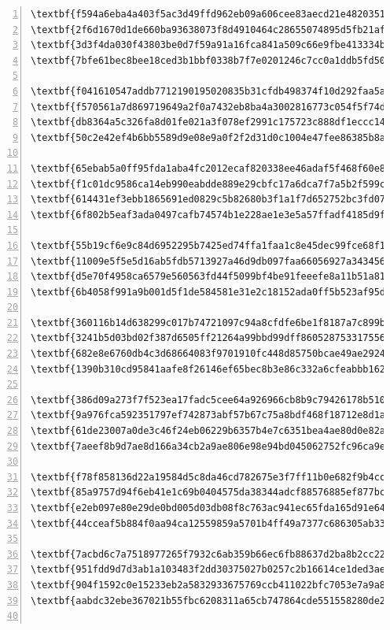 \documentclass[10pt,a4paper]{article}
\begin{document}
\begin{Verbatim}[commandchars=\\\{\},numbers=left]
\textbf{f594a6eba4a403f5ac3d49ffd962eb09a606cee83aecd21e48203518ccee08e4}
\textbf{2f6d1670d1de660ba93638073f8d4910464c28655074895d5fb21af23d25cb22}
\textbf{3d3f4da030f43803be0d7f59a91a16fca841a509c66e9fbe413334b7fad2089f}
\textbf{7bfe61bec8bee18ced3b1bbf0338b7f7e0201246c7cc0a1ddb5fd5013f11e732}

\textbf{f041610547addb7712190195020835b31cfdb498374f10d292faa5af764a1a5d}
\textbf{f570561a7d869719649a2f0a7432eb8ba4a3002816773c054f5f74dc9d10d8ae}
\textbf{db8364a5c326fa8d01fe021a3f078ef2991c175723c888df1eccc1413c2e3f45}
\textbf{50c2e42ef4b6bb5589d9e08e9a0f2f2d31d0c1004e47fee86385b8ab6dc328d4}

\textbf{65ebab5a0ff95fda1aba4fc2012ecaf820338ee46adaf5f468f60e864d591098}
\textbf{f1c01dc9586ca14eb990eabdde889e29cbfc17a6dca7f7a5b2f599c070501fde}
\textbf{614431ef3ebb1865691ed0829c5b82680b3f1a1f7d652752bc3fd07c54595f07}
\textbf{6f802b5eaf3ada0497cafb74574b1e228ae1e3e5a57ffadf4185d9f41dbe63e5}

\textbf{55b19cf6e9c84d6952295b7425ed74ffa1faa1c8e45dec99fce68f1c20092f33}
\textbf{11009e5f5e5d16ab5fdb5713927a46d9db097faa66056927a3434560141d40e2}
\textbf{d5e70f4958ca6579e560563fd44f5099bf4be91feeefe8a11b51a81660814965}
\textbf{6b4058f991a9b001d5f1de584581e31e2c18152ada0ff5b523af95df5566e10d}

\textbf{360116b14d638299c017b74721097c94a8cfdfe6be1f8187a7c899be1ee55d91}
\textbf{3241b5d03bd02f387d6505ff21264a99bbd99dff860528753317556f16af897d}
\textbf{682e8e6760db4c3d68664083f9701910fc448d85750bcae49ae292417d8910e0}
\textbf{1390b310cd95841aafe8f26146ef65bec8b3e86c332a6cfeabbb162fa403aac3}

\textbf{386d09a273f7f523ea17fadc5cee64a926966cb8b9c79426178b5105a88e4247}
\textbf{9a976fca592351797ef742873abf57b67c75a8bdf468f18712e8d1a207960c5e}
\textbf{61de23007a0de3c46f24eb06229b6357b4e7c6351bea4ae80d0e82add09773fc}
\textbf{7aeef8b9d7ae8d166a34cb2a9ae806e98e94bd045062752fc96ca9e13aa0d2c3}

\textbf{f78f858136d22a19584d5c8da46cd782675e3f7ff11b0e682f9b4ccdbececbf6}
\textbf{85a9757d94f6eb41e1c69b0404575da38344adcf88576885ef877bc029f764a8}
\textbf{e2eb097e80e29de0bd005d03db08f8c763ac941ec65fda165d91e64d4c6ca04b}
\textbf{44cceaf5b884f0aa94ca12559859a5701b4ff49a7377c686305ab331b0b0c9d6}

\textbf{7acbd6c7a7518977265f7932c6ab359b66ec6fb88637d2ba8b2cc22d3040febc}
\textbf{951fdd9d7d3ab1a103483f2dd30375027b0257c2b16614ce1ded3aee8e32949e}
\textbf{904f1592c0e15233eb2a5832933675769ccb411022bfc7053e7a9a8ccb976b60}
\textbf{aabdc32ebe367021b55fbc6208311a65cb747864cde551558280de214e9349b6}


\end{Verbatim}
\end{document}
